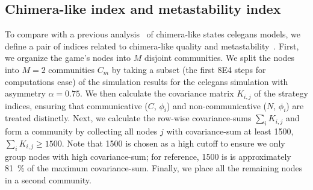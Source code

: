 \documentclass[pdflatex,twocolumn,sn-nature,super]{sn-jnl}
\begin{document}
\subsection{Chimera-like index and metastability index}\label{sec:chimera-metastability-def}
To compare with a previous analysis~\citep{hizanidis2016chimera} of
chimera-like states \gls{celegans} models,
we define a pair of indices related to
chimera-like quality and metastability~\citep{shanahan2010metastable}.
First, we organize the game's nodes
into $M$ disjoint communities.
We split the nodes into $M=2$ communities $C_m$
by taking a subset
(the first \num{8E4} steps for computations ease)
of the simulation results
for the \gls{celegans} simulation with asymmetry $\alpha = \num{0.75}$.
We then calculate the covariance matrix $K_{i,j}$ of the strategy indices,
ensuring that communicative ($C$, $\phi_i$)
and non-communicative ($N$, $\phi_i$) are treated distinctly.
Next, we calculate the row-wise covariance-sums  $\sum_i K_{i,j}$
and form a community by collecting all nodes $j$ with covariance-sum
at least \num{1500}, \ie{} $\sum_i K_{i,j} \ge 1500$.
Note that \num{1500} is chosen as a high cutoff
to ensure we only group nodes with high covariance-sum;
for reference, \num{1500} is is approximately \SI{81}{\percent}
of the maximum covariance-sum.
Finally, we place all the remaining nodes in a second community.
\end{document}
